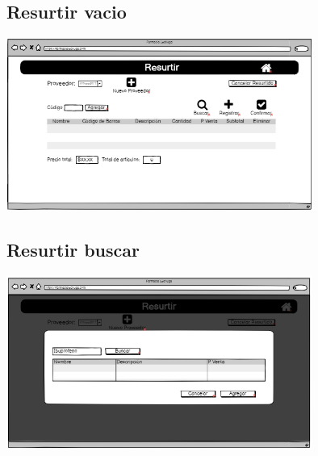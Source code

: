 \begin{flushleft}
	\subsection{Resurtir vacio} \label{UI: resurtir vacio}
	\begin{center}
		\includegraphics[width=10cm]{pantallas/images/11resurtirvacio.png}\\	
		 	
	\end{center}
	\subsection{Resurtir buscar} \label{UI: resurtir buscar}
	\begin{center}
		\includegraphics[width=10cm]{pantallas/images/12resurtirbuscar.png}\\	
		 	
	\end{center}

\end{flushleft}
